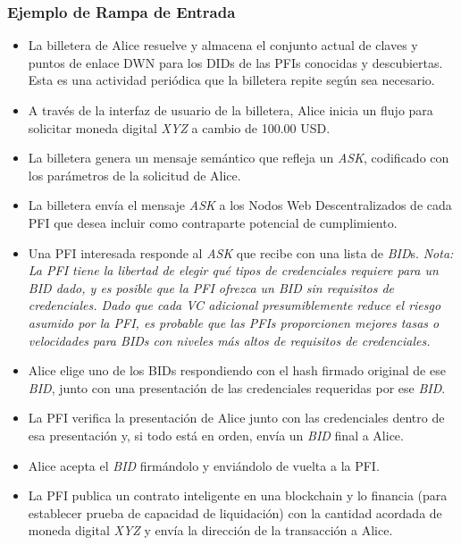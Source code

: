\documentclass[11pt]{article}
\begin{document}
\subsubsection{Ejemplo de Rampa de Entrada}

\begin{itemize}
	\item La billetera de Alice resuelve y almacena el conjunto actual de claves y puntos de enlace DWN para los DIDs de las PFIs conocidas y descubiertas. Esta es una actividad periódica que la billetera repite según sea necesario.

	\item A través de la interfaz de usuario de la billetera, Alice inicia un flujo para solicitar moneda digital \textit{XYZ} a cambio de 100.00 USD.

	\item La billetera genera un mensaje semántico que refleja un \textit{ASK}, codificado con los parámetros de la solicitud de Alice.

	\item La billetera envía el mensaje \textit{ASK} a los Nodos Web Descentralizados de cada PFI que desea incluir como contraparte potencial de cumplimiento.

	\item Una PFI interesada responde al \textit{ASK} que recibe con una lista de \textit{BID}s.\textit{ Nota: La PFI tiene la libertad de elegir qué tipos de credenciales requiere para un BID dado, y es posible que la PFI ofrezca un BID sin requisitos de credenciales. Dado que cada VC adicional presumiblemente reduce el riesgo asumido por la PFI, es probable que las PFIs proporcionen mejores tasas o velocidades para BIDs con niveles más altos de requisitos de credenciales. }

	\item Alice elige uno de los BIDs respondiendo con el hash firmado original de ese \textit{BID}, junto con una presentación de las credenciales requeridas por ese \textit{BID}.

	\item La PFI verifica la presentación de Alice junto con las credenciales dentro de esa presentación y, si todo está en orden, envía un \textit{BID} final a Alice.

	\item Alice acepta el \textit{BID} firmándolo y enviándolo de vuelta a la PFI.

	\item La PFI publica un contrato inteligente en una blockchain y lo financia (para establecer prueba de capacidad de liquidación) con la cantidad acordada de moneda digital \textit{XYZ} y envía la dirección de la transacción a Alice.


\end{itemize}
\end{document}
